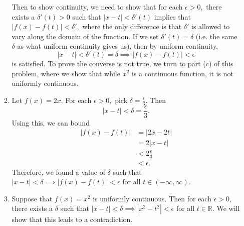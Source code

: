 \documentclass{article}
\numberwithin{equation}{section}
\begin{document}
\begin{enumerate}
\begin{enumerate}
        Then to show continuity, we need to show that for each $\epsilon > 0,$ there exists a $\delta'(t) > 0$ such that $|x-t|<\delta'(t)$ implies that $|f(x)-f(t)|<\delta',$ where the only difference is that $\delta'$ is allowed to vary along the domain of the function. If we set $\delta'(t)=\delta$ (i.e. the same $\delta$ as what uniform continuity gives us), then by uniform continuity, 
        \begin{equation}
            |x-t|<\delta'(t)=\delta \implies |f(x)-f(t)| < \epsilon
        \end{equation}
        is satisfied. To prove the converse is not true, we turn to part (c) of this problem, where we show that while $x^2$ is a continuous function, it is not uniformly continuous.
        \item Let $f(x)=2x.$ For each $\epsilon > 0,$ pick $\delta = \frac{\epsilon}{3}.$ Then
        \begin{equation*}
            |x-t| < \delta = \frac{\epsilon}{3}.
        \end{equation*} 
        Using this, we can bound 
        \begin{align*}
            |f(x)-f(t)| &= |2x-2t| \\ 
            &= 2|x-t| \\ 
            &< 2\frac{\epsilon}{3} \\ 
            &< \epsilon.
        \end{align*}
        Therefore, we found a value of $\delta$ such that $|x-t|<\delta \implies |f(x)-f(t)|<\epsilon$ for all $t\in (-\infty,\infty).$
        \item Suppose that $f(x)=x^2$ is uniformly continuous. Then for each $\epsilon>0,$ there exists a $\delta$ such that $|x-t|<\delta \implies |x^2-t^2| < \epsilon$ for all $t\in \mathbb{R}.$ We will show that this leads to a contradiction.
        

\end{enumerate}
\end{enumerate}
\end{document}

